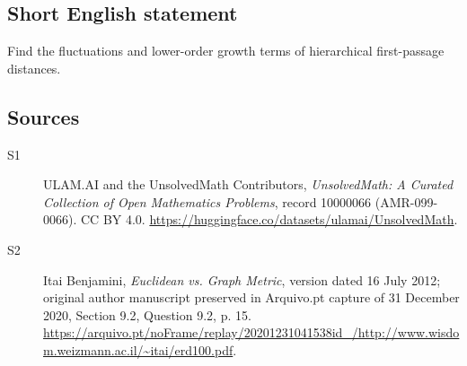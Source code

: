 \documentclass[11pt]{article}
\begin{document}
\subsection{Short English statement}
Find the fluctuations and lower-order growth terms of hierarchical first-passage distances.
\subsection{Sources}
\begin{description}
\item[\hypertarget{source:10000066:1}{S1}] ULAM.AI and the UnsolvedMath Contributors, \emph{UnsolvedMath: A Curated Collection of Open Mathematics Problems}, record 10000066 (AMR-099-0066). CC BY 4.0. \url{https://huggingface.co/datasets/ulamai/UnsolvedMath}.
\item[\hypertarget{source:10000066:2}{S2}] Itai Benjamini, \emph{Euclidean vs. Graph Metric}, version dated 16 July 2012; original author manuscript preserved in Arquivo.pt capture of 31 December 2020, Section 9.2, Question 9.2, p. 15. \url{https://arquivo.pt/noFrame/replay/20201231041538id_/http://www.wisdom.weizmann.ac.il/~itai/erd100.pdf}.
\end{description}
\label{end:10000066}
\end{document}

